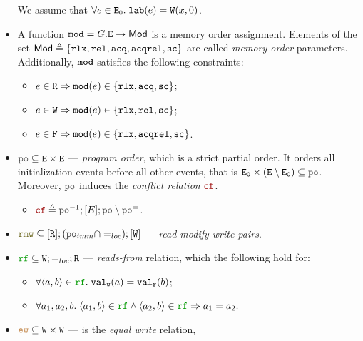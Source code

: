 \documentclass[12pt]{article}
\begin{document}
\begin{definition}
\begin{itemize}
\begin{itemize}
    \end{itemize}
    We assume that $\forall{e} \in {\mathtt{E_0}}. \; {\mathtt{lab}}(e) = {\mathtt{W}}({x},{0})$. \\
  \item A function ${\mathtt{mod}} = G.{\mathtt{E}} \rightarrow \mathsf{Mod}$ is a memory order assignment.
    Elements of the set $\mathsf{Mod} \triangleq \{ \mathtt{rlx}, {\mathtt{rel}}, {\mathtt{acq}}, {\mathtt{acqrel}}, {\mathtt{sc}} \}$ are
    called \emph{memory order} parameters.
    Additionally, ${\mathtt{mod}}$ satisfies the following constraints:
    \begin{itemize}
    \item $e \in {\mathtt{R}} \Rightarrow {\mathtt{mod}}(e) \in \{ \mathtt{rlx}, {\mathtt{acq}}, {\mathtt{sc}} \}$;
    \item $e \in {\mathtt{W}} \Rightarrow {\mathtt{mod}}(e) \in \{ \mathtt{rlx}, {\mathtt{rel}}, {\mathtt{sc}} \}$;
    \item $e \in {\mathtt{F}} \Rightarrow {\mathtt{mod}}(e) \in \{ \mathtt{rlx}, {\mathtt{acqrel}}, {\mathtt{sc}} \}$.
    \end{itemize}
  \item $\lPO \subseteq \lE \times \lE$ --- \emph{program order}, which is a strict partial order.
    It orders all initialization events before all other events,
    that is $\lEi \times (\lE \setminus \lEi) \subseteq \lPO$.
    Moreover, $\lPO$ induces the \emph{conflict relation} $\lCF$.
    \begin{itemize}
      \item  $\lCF \defeq \lPO^{-1};[E];\lPO \setminus \lPO^{=}$.
    \end{itemize}
  \item $\lRMW \subseteq [\lR];(\lPO_{imm} \cap =_{loc});[\lW]$ ---
    \emph{read-modify-write pairs}.
  \item $\lRF \subseteq \lW; =_{loc}; \lR$ --- \emph{reads-from} relation, which the following
    hold for:
    \begin{itemize}
    \item $\forall{\tup{a, b}} \in \lRF. \; \lVALW(a) = \lVALR(b)$;
    \item $\forall{a_1, a_2, b}. \; \tup{a_1, b} \in \lRF \wedge \tup{a_2, b} \in \lRF \Rightarrow a_1 = a_2.$
    \end{itemize}
  \item $\lEW \subseteq \lW \times \lW$ --- is the \emph{equal write} relation, 

\end{itemize}
\end{definition}
\end{document}
